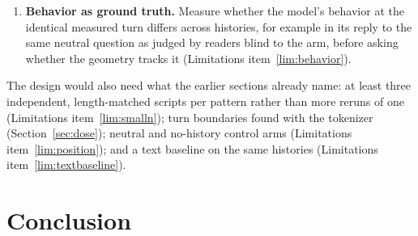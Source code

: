 \documentclass[11pt,a4paper]{article}
\begin{document}
\begin{enumerate}[nosep]
          keys would be projected on directions in a different frame; and
          the key at layer~3 still depends on how many tokens precede it,
          and on what they say, through linear-attention layers 0--2.
          De-rotation can serve only as an extra diagnostic, with the
          directions rebuilt from de-rotated calibration keys.
    \item \textbf{Behavior as ground truth.} Measure whether the model's
          behavior at the identical measured turn differs across
          histories, for example in its reply to the same neutral
          question as judged by readers blind to the arm, before asking
          whether the geometry tracks it (Limitations item~\ref{lim:behavior}).
\end{enumerate}

The design would also need what the earlier sections already name: at
least three independent, length-matched scripts per pattern rather than
more reruns of one (Limitations item~\ref{lim:smalln}); turn boundaries found with the
tokenizer (Section~\ref{sec:dose}); neutral and no-history control arms
(Limitations item~\ref{lim:position}); and a text baseline on the same histories
(Limitations item~\ref{lim:textbaseline}).

\section{Conclusion}
\end{document}
